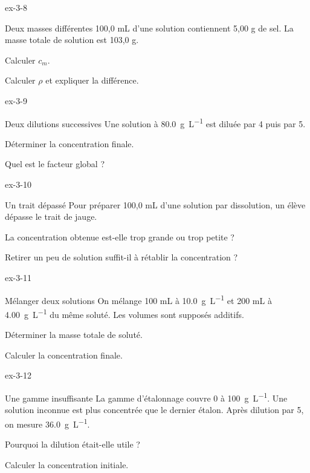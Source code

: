 \begin{blocLivre}{ex-3-8}\begin{exercice}[2]{Deux masses différentes}
100,0 mL d’une solution contiennent 5,00 g de sel. La masse totale de solution est 103,0 g.
\begin{questions}
\item Calculer $c_m$.
\item Calculer $\rho$ et expliquer la différence.
\end{questions}
\end{exercice}\end{blocLivre}
\begin{blocLivre}{ex-3-9}\begin{exercice}[3]{Deux dilutions successives}
Une solution à \qty{80,0}{g.L^{-1}} est diluée par 4 puis par 5.
\begin{questions}
\item Déterminer la concentration finale.
\item Quel est le facteur global ?
\end{questions}
\end{exercice}\end{blocLivre}
\begin{blocLivre}{ex-3-10}\begin{exercice}[3]{Un trait dépassé}
Pour préparer 100,0 mL d’une solution par dissolution, un élève dépasse le trait de jauge.
\begin{questions}
\item La concentration obtenue est-elle trop grande ou trop petite ?
\item Retirer un peu de solution suffit-il à rétablir la concentration ?
\end{questions}
\end{exercice}\end{blocLivre}
\begin{blocLivre}{ex-3-11}\begin{exercice}[3]{Mélanger deux solutions}
On mélange 100 mL à \qty{10,0}{g.L^{-1}} et 200 mL à \qty{4,00}{g.L^{-1}} du même soluté. Les volumes sont supposés additifs.
\begin{questions}
\item Déterminer la masse totale de soluté.
\item Calculer la concentration finale.
\end{questions}
\end{exercice}\end{blocLivre}
\begin{blocLivre}{ex-3-12}\begin{exercice}[3]{Une gamme insuffisante}
La gamme d’étalonnage couvre 0 à \qty{100}{g.L^{-1}}. Une solution inconnue est plus concentrée que le dernier étalon. Après dilution par 5, on mesure \qty{36,0}{g.L^{-1}}.
\begin{questions}
\item Pourquoi la dilution était-elle utile ?
\item Calculer la concentration initiale.
\end{questions}
\end{exercice}\end{blocLivre}

